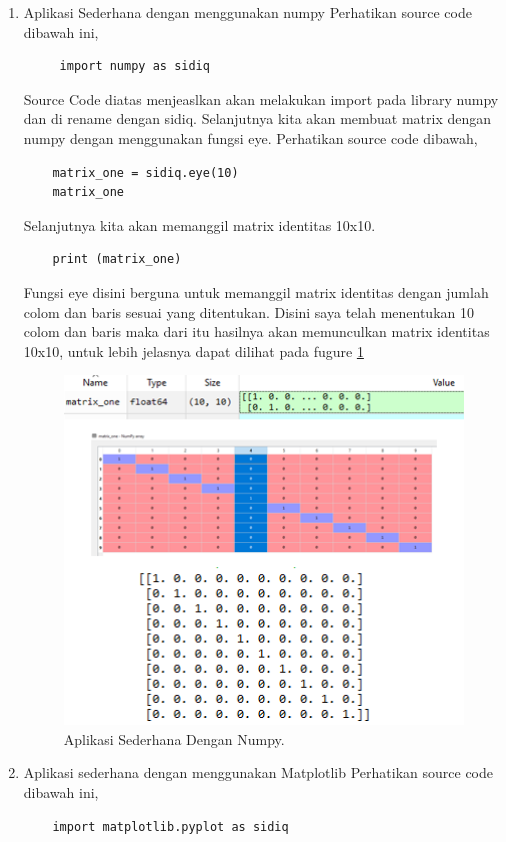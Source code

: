\begin{enumerate}
\item Aplikasi Sederhana dengan menggunakan numpy
\subitem Perhatikan source code dibawah ini,
	\begin{verbatim}
	 import numpy as sidiq
	\end{verbatim}
Source Code diatas menjeaslkan akan melakukan import pada library numpy dan di rename dengan sidiq. Selanjutnya kita akan membuat matrix dengan numpy dengan menggunakan fungsi eye. Perhatikan source code dibawah,
	\begin{verbatim}
	matrix_one = sidiq.eye(10)
	matrix_one
	\end{verbatim}

Selanjutnya kita akan memanggil matrix identitas 10x10. 
	\begin{verbatim}
	print (matrix_one)
	\end{verbatim}
Fungsi eye disini berguna untuk memanggil matrix identitas dengan jumlah colom dan baris sesuai yang ditentukan. Disini saya telah menentukan 10 colom dan baris maka dari itu hasilnya akan memunculkan matrix identitas 10x10, untuk lebih jelasnya dapat dilihat pada fugure \ref{YNN}

	\begin{figure}[ht]
	\centerline{\includegraphics[width=1\textwidth]{figures/YN/Chapter3/YNNumpy.png}}
	\caption{Aplikasi Sederhana Dengan Numpy.}
	\label{YNN}
	\end{figure}

\item Aplikasi sederhana dengan menggunakan Matplotlib
\subitem Perhatikan source code dibawah ini,
	\begin{verbatim}
	import matplotlib.pyplot as sidiq


\end{verbatim}
\end{enumerate}
